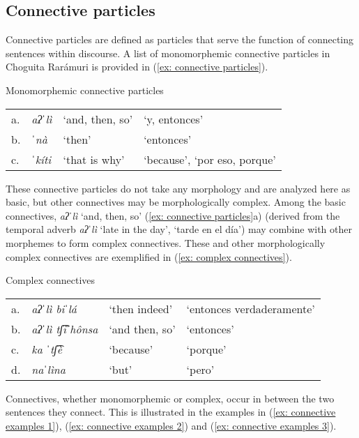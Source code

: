\subsection{Connective particles}
\label{subsec: connective particles}

Connective particles are defined as particles that serve the function of connecting sentences within discourse. A list of monomorphemic connective particles in Choguita Rarámuri is provided in (\ref{ex: connective particles}).

\ea\label{ex: connective particles}
{Monomorphemic connective particles}

\begin{tabular}{llll}
    a. & {\textit{aʔˈlì}}&{`and, then, so'}& {`y, entonces'}\\
    b. & {\textit{ˈnà}}&{`then'}& {`entonces'}\\
    c. & {\textit{ˈkíti}}&{`that is why'}& {`because', `por eso, porque'}\\
\end{tabular}
    \z

These connective particles do not take any morphology and are analyzed here as basic, but other connectives may be morphologically complex. Among the basic connectives, \textit{aʔˈlì} `and, then, so' (\ref{ex: connective particles}a) (derived from the temporal adverb \textit{aʔˈlì} `late in the day', `tarde en el día') may combine with other morphemes to form complex connectives. These and other morphologically complex connectives are exemplified in (\ref{ex: complex connectives}).

\ea\label{ex: complex connectives}
{Complex connectives}

\begin{tabular}{llll}
    a. & {\textit{aʔˈlì biˈlá}}&{`then indeed'}&{`entonces verdaderamente'}\\
    b. & {\textit{aʔˈlì tʃ͡iˈhônsa}}&{`and then, so'}&{`entonces'}\\
    c. & {\textit{ka ˈtʃ͡è}}&{`because'}& {`porque'}\\
    d. & {\textit{naˈlìna}}&{`but'}&{`pero'}\\
\end{tabular}
    \z

Connectives, whether monomorphemic or complex, occur in between the two sentences they connect. This is illustrated in the examples in (\ref{ex: connective examples 1}), (\ref{ex: connective examples 2}) and (\ref{ex: connective examples 3}).

